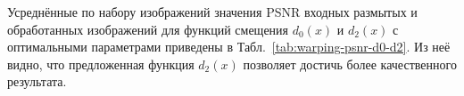 Усреднённые по набору изображений значения PSNR входных размытых и обработанных изображений для функций смещения $d_0\left(x\right)$ и $d_2\left(x\right)$ с оптимальными параметрами приведены в Табл.~\ref{tab:warping-psnr-d0-d2}. Из неё видно, что предложенная функция $d_2\left(x\right)$ позволяет достичь более качественного результата.


